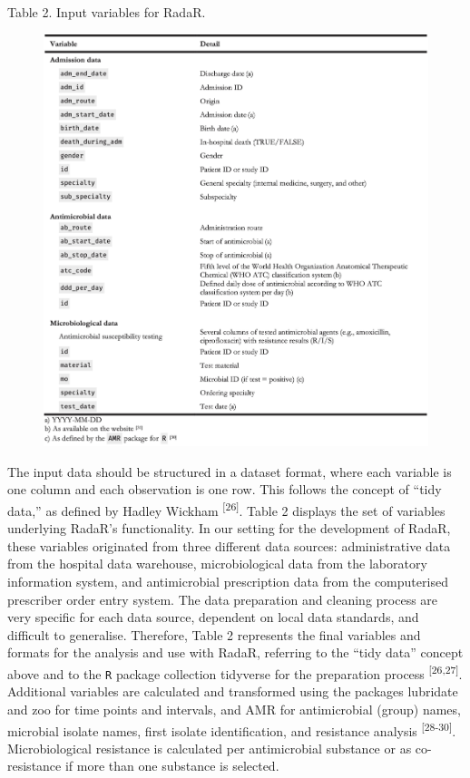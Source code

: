\documentclass[
]{book}
\begin{document}
Table 2. Input variables for RadaR.

\begin{figure}

{\centering \includegraphics[width=1\linewidth]{images/05-t02} 

}

\end{figure}

The input data should be structured in a dataset format, where each variable is one column and each observation is one row. This follows the concept of ``tidy data,'' as defined by Hadley Wickham \textsuperscript{{[}26{]}}. Table 2 displays the set of variables underlying RadaR's functionality. In our setting for the development of RadaR, these variables originated from three different data sources: administrative data from the hospital data warehouse, microbiological data from the laboratory information system, and antimicrobial prescription data from the computerised prescriber order entry system. The data preparation and cleaning process are very specific for each data source, dependent on local data standards, and difficult to generalise. Therefore, Table 2 represents the final variables and formats for the analysis and use with RadaR, referring to the ``tidy data'' concept above and to the \texttt{R} package collection tidyverse for the preparation process \textsuperscript{{[}26,27{]}}. Additional variables are calculated and transformed using the packages lubridate and zoo for time points and intervals, and AMR for antimicrobial (group) names, microbial isolate names, first isolate identification, and resistance analysis \textsuperscript{{[}28-30{]}}. Microbiological resistance is calculated per antimicrobial substance or as co-resistance if more than one substance is selected.
\end{document}
